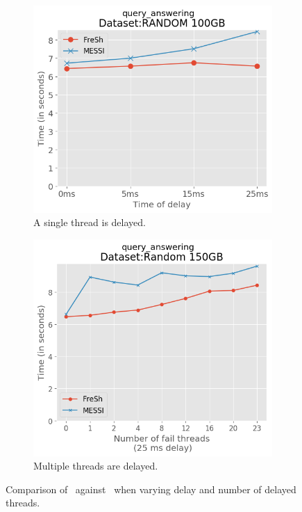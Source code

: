 \begin{figure}[htbp]
    \centering
    \begin{subfigure}{0.48\textwidth}  
        \includegraphics[width=\textwidth]{figures/Experiments/failure-delay-random-query25ms.png}
        \caption{A single thread is delayed.}
        \label{fig:eval:failure-query:random:failure1}
    \end{subfigure}    
    \begin{subfigure}{0.48\textwidth}  
        \includegraphics[width=\textwidth]{figures/Experiments/fail-threads-random-query25ms.png}
        \caption{Multiple threads are delayed.}
        \label{fig:eval:failure-query:random:failure2}
    \end{subfigure}    

    \caption{Comparison of \Fresh\ against \MESSI\ when varying delay and number of delayed threads.}
    \label{fig:eval:failure-query:random}
\end{figure}

